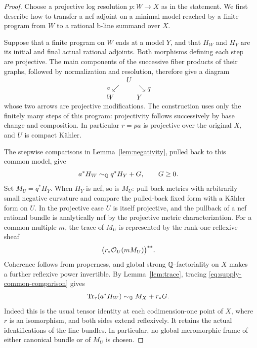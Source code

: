 \begin{proof}
Choose a projective log resolution $p:W\to X$ as in the statement.
We first describe how to transfer a nef adjoint on a minimal model reached
by a finite program from $W$ to a rational b-line summand over $X$.

Suppose that a finite program on $W$ ends at a model
$Y$, and that $H_W$ and $H_Y$ are its initial and final actual rational
adjoints.  Both morphisms defining each step are projective.  The main
components of the successive fiber products of their graphs, followed
by normalization and resolution, therefore give a diagram
\[
 \begin{array}{ccc}
 &U&\\[-2pt]
 a\swarrow&&\searrow q\\[-2pt]
 W&&Y
 \end{array}
\]
whose two arrows are projective modifications.  The construction uses
only the finitely many steps of this program: projectivity follows
successively by base change and composition.  In particular $r=pa$ is
projective over the original $X$, and $U$ is compact Kähler.

The stepwise comparisons in Lemma~\ref{lem:negativity}, pulled back to
this common model, give
\begin{equation}\label{eq:supply-common-comparison}
 a^*H_W\sim_{\mathbb Q} q^*H_Y+G,\qquad G\geq0.
\end{equation}
Set $M_U=q^*H_Y$.  When $H_Y$ is nef, so is $M_U$: pull back metrics with
arbitrarily small negative curvature and compare the pulled-back fixed
form with a Kähler form on $U$.  In the projective case $U$ is itself
projective, and the pullback of a nef rational bundle is analytically
nef by the projective metric characterization.  For a common multiple
$m$, the trace of $M_U$ is
represented by the rank-one reflexive sheaf
\[
 \bigl(r_*\mathcal O_U(mM_U)\bigr)^{**}.
\]
Coherence follows from properness, and global strong $\mathbb Q$-factoriality
on $X$ makes a further reflexive power invertible.  By
Lemma~\ref{lem:trace}, tracing \eqref{eq:supply-common-comparison} gives
\begin{equation}\label{eq:supply-trace-comparison}
 \operatorname{Tr}_r(a^*H_W)\sim_{\mathbb Q} M_X+r_*G.
\end{equation}
Indeed this is the usual tensor identity at each codimension-one point
of $X$, where $r$ is an isomorphism, and both sides extend reflexively.
It retains the actual identifications of the line bundles.  In
particular, no global meromorphic frame of either canonical bundle or
of $M_U$ is chosen.


\end{proof}
